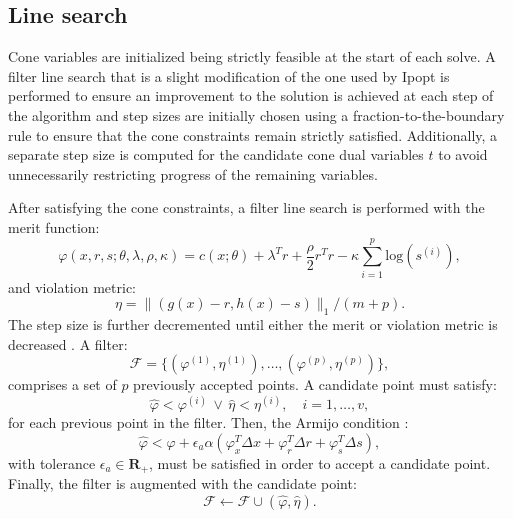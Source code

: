 \subsection{Line search}
Cone variables are initialized being strictly feasible at the start of each solve. A filter line search that is a slight modification of the one used by Ipopt \cite{wachter2006implementation} is performed to ensure an improvement to the solution is achieved at each step of the algorithm and step sizes are initially chosen using a fraction-to-the-boundary rule to ensure that the cone constraints remain strictly satisfied. Additionally, a separate step size is computed for the candidate cone dual variables $t$ to avoid unnecessarily restricting progress of the remaining variables.

After satisfying the cone constraints, a filter line search is performed with the merit function:
\begin{equation}
	\varphi(x, r, s; \theta, \lambda, \rho, \kappa) = c(x; \theta) + \lambda^T r + \frac{\rho}{2} r^T r - \kappa \sum \limits_{i = 1}^p \mbox{log}(s^{(i)}), \label{calipso_merit}
\end{equation}
and violation metric:
\begin{equation} 
	\eta = \|(g(x) - r, h(x) - s) \|_1 / (m + p). \label{slack_constraint_violation}
\end{equation}
The step size is further decremented until either the merit or violation metric is decreased \cite{wachter2005line}. A filter: 
\begin{equation}
\mathcal{F} = \{(\varphi^{(1)}, \eta^{(1)}), \dots, (\varphi^{(p)}, \eta^{(p)})\},
\end{equation}
comprises a set of $p$ previously accepted points. 
A candidate point must satisfy:
\begin{equation} 
  \hat{\varphi} < \varphi^{(i)} \, \lor \, \hat{\eta} < \eta^{(i)}, \quad i = 1, \dots, v,
\end{equation}
for each previous point in the filter. Then, the Armijo condition \cite{nocedal2006numerical}:
\begin{equation} 
  \hat{\varphi} < \varphi + \epsilon_a \alpha ( \varphi_x^T \Delta x + \varphi_r^T \Delta r + \varphi_s^T \Delta s), \label{calipso_armijo}
\end{equation}
with tolerance $\epsilon_a \in \mathbf{R}_+$, must be satisfied in order to accept a candidate point. Finally, the filter is augmented with the candidate point:
\begin{equation} 
  \mathcal{F} \leftarrow \mathcal{F} \cup (\hat{\varphi}, \hat{\eta}).
\end{equation}

